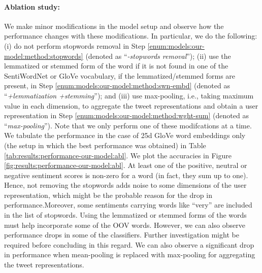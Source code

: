 \paragraph{Ablation study:}
We make minor modifications in the model setup and observe how the performance changes with these modifications. In particular, we do the following: (i) do not perform stopwords removal in Step \ref{enum:models:our-model:method:stopwords} (denoted as ``\textit{-stopwords removal}''); (ii) use the lemmatized or stemmed form of the word if it is not found in one of the SentiWordNet or \ac{GloVe} vocabulary, if the lemmatized/stemmed forms are present, in Step \ref{enum:models:our-model:method:swn-embd} (denoted as ``\textit{+lemmatization +stemming}''); and (iii) use max-pooling, i.e., taking maximum value in each dimension, to aggregate the tweet representations and obtain a user representation in Step \ref{enum:models:our-model:method:wght-sum} (denoted as ``\textit{max-pooling}''). Note that we only perform one of these modifcations at a time. We tabulate the performance in the case of 25d \ac{GloVe} word embeddings only (the setup in which the best performance was obtained) in Table \ref{tab:results:performance-our-model:abl}. We plot the accuracies in Figure \ref{fig:results:performance-our-model:abl}.
At least one of the positive, neutral or negative sentiment scores is non-zero for a word (in fact, they sum up to one). Hence, not removing the stopwords adds noise to some dimensions of the user representation, which might be the probable reason for the drop in performance.{Moreover, some sentiments carrying words like ``very'' are included in the list of stopwords.}
Using the lemmatized or stemmed forms of the words must help incorporate some of the OOV words. However, we can also observe performance drops in some of the classifiers. Further investigation might be required before concluding in this regard.
We can also observe a significant drop in performance when mean-pooling is replaced with max-pooling for aggregating the tweet representations.


